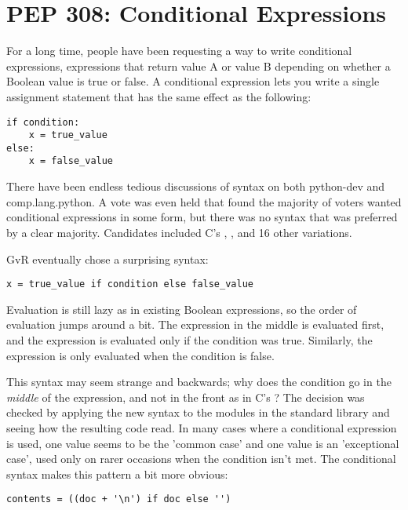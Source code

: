 \documentclass{howto}
\begin{document}
\section{PEP 308: Conditional Expressions\label{pep-308}}

For a long time, people have been requesting a way to write
conditional expressions, expressions that return value A or value B
depending on whether a Boolean value is true or false.  A conditional
expression lets you write a single assignment statement that has the
same effect as the following:

\begin{verbatim}
if condition:
    x = true_value
else:
    x = false_value
\end{verbatim}

There have been endless tedious discussions of syntax on both
python-dev and comp.lang.python.  A vote was even held that found the
majority of voters wanted conditional expressions in some form,
but there was no syntax that was preferred by a clear majority.
Candidates included C's ,
, and 16 other variations.

GvR eventually chose a surprising syntax:

\begin{verbatim}
x = true_value if condition else false_value
\end{verbatim}

Evaluation is still lazy as in existing Boolean expressions, so the
order of evaluation jumps around a bit.  The 
expression in the middle is evaluated first, and the 
expression is evaluated only if the condition was true.  Similarly,
the  expression is only evaluated when the condition
is false.

This syntax may seem strange and backwards; why does the condition go
in the \emph{middle} of the expression, and not in the front as in C's
?  The decision was checked by applying the new syntax
to the modules in the standard library and seeing how the resulting
code read.  In many cases where a conditional expression is used, one
value seems to be the 'common case' and one value is an 'exceptional
case', used only on rarer occasions when the condition isn't met.  The
conditional syntax makes this pattern a bit more obvious:

\begin{verbatim}
contents = ((doc + '\n') if doc else '')
\end{verbatim}
\end{document}

